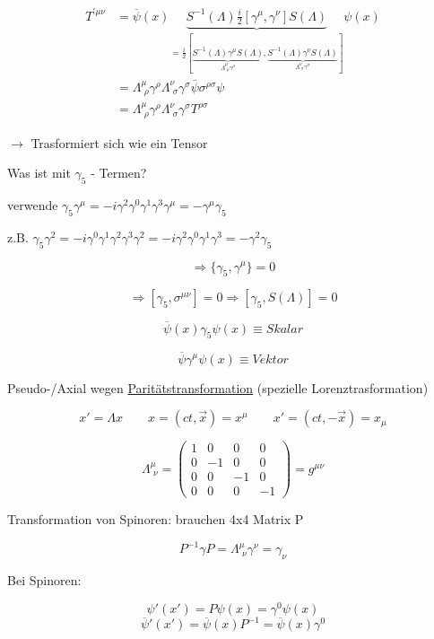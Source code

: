\begin{align}
T^{'\mu\nu}&=\overline \psi(x)\underbrace{  S^{-1}(\Lambda)\frac{i}{2}[\gamma^\mu,\gamma^\nu]S(\Lambda)}_{  = \frac{i}{2}[\underbrace{S^{-1}(\Lambda)\gamma^\mu S(\Lambda)}_{\Lambda^\mu_{\,\,\rho}\gamma^\rho},\underbrace{S^{-1}(\Lambda)\gamma^\nu S(\Lambda)}_{\Lambda^\nu_{\,\,\sigma}\gamma^\sigma} ]  } \psi(x)\\
&= \Lambda^\mu_{\,\,\rho}\gamma^\rho \Lambda^\nu_{\,\,\sigma}\gamma^\sigma\overline \psi \sigma^{\rho\sigma}\psi\\
&= \Lambda^\mu_{\,\,\rho}\gamma^\rho \Lambda^\nu_{\,\,\sigma}\gamma^\sigma T^{\rho\sigma}
\end{align}

\(\rightarrow \) Trasformiert sich wie ein Tensor

Was ist mit \(\gamma_5\) - Termen?

verwende \(\gamma_5\gamma^\mu =- i\gamma^2\gamma^0\gamma^1\gamma^3\gamma^\mu = -\gamma^\mu\gamma_5 \)

z.B. \(\gamma_5\gamma^2 = - i\gamma^0\gamma^1\gamma^2\gamma^3\gamma^2 = - i\gamma^2\gamma^0\gamma^1\gamma^3 = -\gamma^2\gamma_5 \)

\[\Rightarrow \{ \gamma_5,\gamma^\mu \} = 0\]

\[\Rightarrow [\gamma_5,\sigma^{\mu\nu}]=0 \Rightarrow [\gamma_5,S(\Lambda)]=0\]

\[\overline\psi(x)\gamma_5\psi(x) \equiv Skalar\]


\[\overline \psi \gamma^\mu\psi(x) \equiv Vektor \]

Pseudo-/Axial wegen \underline{Paritätstransformation} (spezielle Lorenztrasformation)

\[x' = \Lambda x \qquad x=(ct,\vec x) = x^\mu  \qquad x'=(ct,-\vec x) = x_\mu  \]

\[\Lambda^\mu_{\,\,\nu} = \begin{pmatrix} 1&0&0&0\\   0&-1&0&0\\  0&0&-1&0\\   0&0&0&-1 \end{pmatrix} = g^{\mu\nu} \]

Transformation von Spinoren: brauchen 4x4 Matrix P

\[P^{-1}\gamma P = \Lambda^\mu_{\,\,\nu}\gamma^\nu = \gamma_\nu\]


Bei Spinoren:

\[\psi'(x') = P\psi(x) = \gamma^0\psi(x) \]
\[\overline \psi'(x') = \overline\psi(x)P^{-1} = \overline \psi(x) \gamma^0 \]


